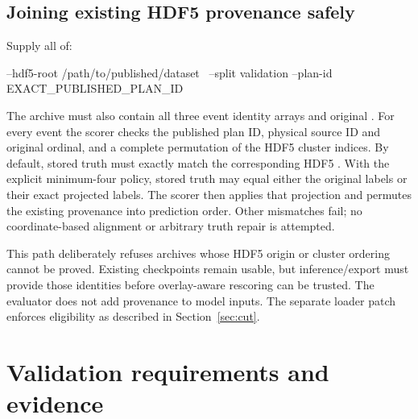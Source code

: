 \documentclass[11pt,letterpaper]{article}
\newcommand{\code}[1]{\texttt{\detokenize{#1}}}
\begin{document}
\subsection{Joining existing HDF5 provenance safely}
Supply all of:
\begin{Code}
  --hdf5-root /path/to/published/dataset \
  --split validation --plan-id EXACT_PUBLISHED_PLAN_ID
\end{Code}
The archive must also contain all three event identity arrays and original
\code{point_ids}. For every event the scorer checks the published plan ID,
physical source ID and original ordinal, and a complete permutation of the HDF5
cluster indices. By default, stored truth must exactly match the corresponding
HDF5 \code{primary_segment}. With the explicit minimum-four policy, stored truth
may equal either the original labels or their exact projected labels. The scorer
then applies that projection and permutes the existing provenance into prediction
order. Other mismatches fail; no coordinate-based alignment or arbitrary truth
repair is attempted.

This path deliberately refuses archives whose HDF5 origin or cluster ordering
cannot be proved. Existing checkpoints remain usable, but inference/export
must provide those identities before overlay-aware rescoring can be trusted.
The evaluator does not add provenance to model inputs. The separate loader patch
enforces eligibility as described in Section~\ref{sec:cut}.

\section{Validation requirements and evidence}
\end{document}
